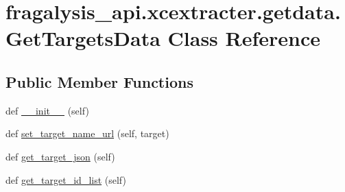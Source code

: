 \hypertarget{classfragalysis__api_1_1xcextracter_1_1getdata_1_1_get_targets_data}{}\section{fragalysis\+\_\+api.\+xcextracter.\+getdata.\+Get\+Targets\+Data Class Reference}
\label{classfragalysis__api_1_1xcextracter_1_1getdata_1_1_get_targets_data}
\subsection*{Public Member Functions}
\begin{DoxyCompactItemize}
\item 
def \hyperlink{classfragalysis__api_1_1xcextracter_1_1getdata_1_1_get_targets_data_a40260f1d84f75c354f8b1b7124732b3a}{\+\_\+\+\_\+init\+\_\+\+\_\+} (self)
\item 
def \hyperlink{classfragalysis__api_1_1xcextracter_1_1getdata_1_1_get_targets_data_abf5179a2489b7edaa16dc6bc8c89f051}{set\+\_\+target\+\_\+name\+\_\+url} (self, target)
\item 
def \hyperlink{classfragalysis__api_1_1xcextracter_1_1getdata_1_1_get_targets_data_ab67e7a9bfced7f671422ef8f4b6997c9}{get\+\_\+target\+\_\+json} (self)
\item 
def \hyperlink{classfragalysis__api_1_1xcextracter_1_1getdata_1_1_get_targets_data_af26e1f97fa431c2bb490985e7af0eb45}{get\+\_\+target\+\_\+id\+\_\+list} (self)
\end{DoxyCompactItemize}
